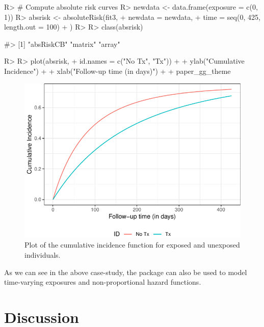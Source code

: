 \documentclass[
]{jss}
\begin{document}
\begin{CodeChunk}

\begin{CodeInput}
R> # Compute absolute risk curves
R> newdata <- data.frame(exposure = c(0, 1))
R> absrisk <- absoluteRisk(fit3,
+   newdata = newdata,
+   time = seq(0, 425, length.out = 100)
+ )
R> 
R> class(absrisk)
\end{CodeInput}

\begin{CodeOutput}
#> [1] "absRiskCB" "matrix"    "array"
\end{CodeOutput}

\begin{CodeInput}
R> 
R> plot(absrisk,
+      id.names = c("No Tx", "Tx")) + 
+   ylab("Cumulative Incidence") +
+   xlab("Follow-up time (in days)") +
+   paper_gg_theme
\end{CodeInput}
\begin{figure}[ht]

{\centering \includegraphics[width=\textwidth,keepaspectratio=true]{../figures/stanford-risk-1} 

}

\caption{\label{fig:cs4CIF} Plot of the cumulative incidence function for exposed and unexposed individuals.}\label{fig:stanford-risk}
\end{figure}
\end{CodeChunk}

As we can see in the above case-study, the  package can
also be used to model time-varying exposures and non-proportional hazard
functions.

\hypertarget{discussion}{%
\section{Discussion}\label{discussion}}
\end{document}
